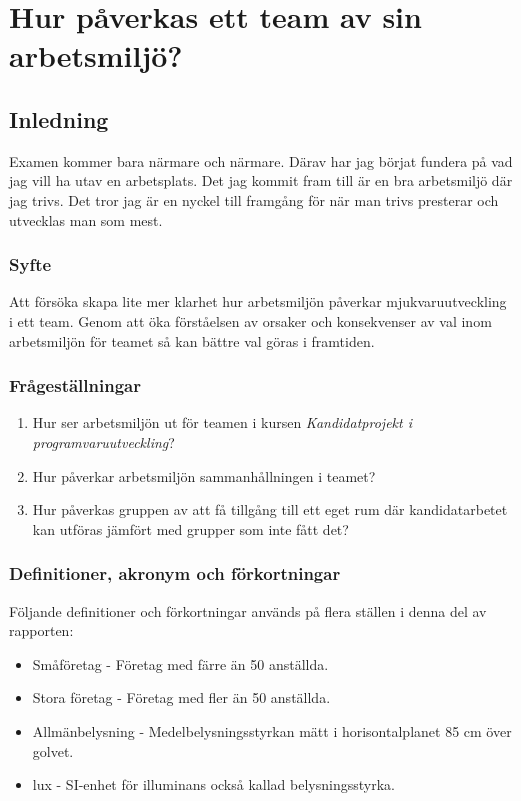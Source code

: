 \chapter{Hur påverkas ett team av sin arbetsmiljö?}
\label{cha:indiv-report-hampus}

\section{Inledning}
\label{sec:introduction-hampus}

Examen kommer bara närmare och närmare. Därav har jag börjat fundera på vad jag vill ha utav en arbetsplats. Det jag kommit fram till är en bra arbetsmiljö där jag trivs. Det tror jag är en nyckel till framgång för när man trivs presterar och utvecklas man som mest. 

\subsection{Syfte}
\label{sec:purpose-hampus}

Att försöka skapa lite mer klarhet hur  arbetsmiljön påverkar mjukvaruutveckling i ett team. Genom att öka förståelsen av orsaker och konsekvenser av val inom arbetsmiljön för teamet så kan bättre val göras i framtiden.

\subsection{Frågeställningar}
\label{sec:issue-hampus}

\begin{enumerate}
\item Hur ser arbetsmiljön ut för teamen i kursen \textit{Kandidatprojekt i programvaruutveckling}?
\item Hur påverkar arbetsmiljön sammanhållningen i teamet?
\item Hur påverkas gruppen av att få tillgång till ett eget rum där kandidatarbetet kan utföras jämfört med grupper som inte fått det?
\end{enumerate}

\subsection{Definitioner, akronym och förkortningar}
Följande definitioner och förkortningar används på flera ställen i denna del av rapporten:

\begin{itemize}
\item Småföretag - Företag med färre än 50 anställda.
\item Stora företag - Företag med fler än 50 anställda.
\item Allmänbelysning - Medelbelysningsstyrkan mätt i horisontalplanet 85 cm över golvet.
\item lux - SI-enhet för illuminans också kallad belysningsstyrka.
\end{itemize}

